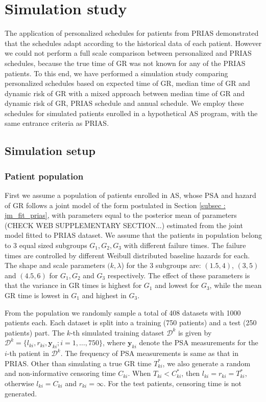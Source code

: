 
\section{Simulation study}
\label{sec: simulation_study}
The application of personalized schedules for patients from PRIAS demonstrated that the schedules adapt according to the historical data of each patient. However we could not perform a full scale comparison between personalized and PRIAS schedules, because the true time of GR was not known for any of the PRIAS patients. To this end, we have performed a simulation study comparing personalized schedules based on expected time of GR, median time of GR and dynamic risk of GR with a mixed approach between median time of GR and dynamic risk of GR, PRIAS schedule and annual schedule. We employ these schedules for simulated patients enrolled in a hypothetical AS program, with the same entrance criteria as PRIAS.

\subsection{Simulation setup}
\label{subsec : simulation_setup}
\subsubsection{Patient population}
First we assume a population of patients enrolled in AS, whose PSA and hazard of GR follows a joint model of the form postulated in Section \ref{subsec : jm_fit_prias}, with parameters equal to the posterior mean of parameters (CHECK WEB SUPPLEMENTARY SECTION...) estimated from the joint model fitted to PRIAS dataset. We assume that the patients in population belong to 3 equal sized subgroups $G_1, G_2, G_3$ with different failure times. The failure times are controlled by different Weibull distributed baseline hazards for each. The shape and scale parameters $(k, \lambda$) for the 3 subgroups are: $(1.5, 4)$, $(3, 5)$ and $(4.5, 6)$ for $G_1, G_2$ and $G_3$ respectively. The effect of these parameters is that the variance in GR times is highest for $G_1$ and lowest for $G_3$, while the mean GR time is lowest in $G_1$ and highest in $G_3$.

From the population we randomly sample a total of 408 datasets with 1000 patients each. Each dataset is split into a training (750 patients) and a test (250 patients) part. The $k$-th simulated training dataset $\mathcal{D}^k$ is given by $\mathcal{D}^k = \{l_{ki}, r_{ki}, \boldsymbol{y}_{ki}; i = 1, \ldots, 750\}$, where $\boldsymbol{y}_{ki}$ denote the PSA measurements for the $i$-th patient in $\mathcal{D}^k$. The frequency of PSA measurements is same as that in PRIAS. Other than simulating a true GR time $T^*_{ki}$, we also generate a random and non-informative censoring time $C_{ki}$. When $T_{ki} < C^*_{ki}$, then $l_{ki} = r_{ki} = T^*_{ki}$, otherwise $l_{ki} = C_{ki}$ and $r_{ki} = \infty$. For the test patients, censoring time is not generated.

